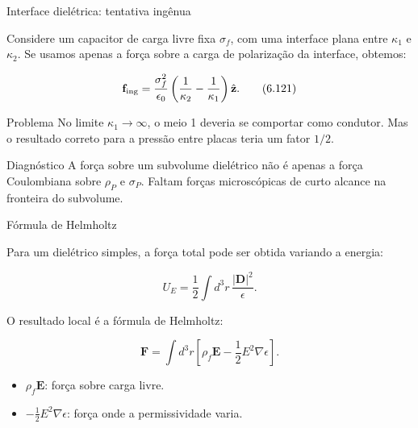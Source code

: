 \documentclass[aspectratio=169]{beamer}
\begin{document}
\begin{frame}{Interface dielétrica: tentativa ingênua}

\small

Considere um capacitor de carga livre fixa \(\sigma_f\), com uma interface plana
entre \(\kappa_1\) e \(\kappa_2\). Se usamos apenas a força sobre a carga de
polarização da interface, obtemos:

\begin{eqbox}
\begin{equation}
\mathbf f_{\rm ing}
=
\frac{\sigma_f^2}{\epsilon_0}
\left(
\frac{1}{\kappa_2}
-
\frac{1}{\kappa_1}
\right)\hat{\mathbf z}.
\tag{6.121}
\end{equation}
\end{eqbox}

\begin{alertblock}{Problema}
No limite \(\kappa_1\to\infty\), o meio 1 deveria se comportar como condutor.
Mas o resultado correto para a pressão entre placas teria um fator \(1/2\).
\end{alertblock}

\begin{mybox}{Diagnóstico}
A força sobre um subvolume dielétrico não é apenas a força Coulombiana sobre
\(\rho_P\) e \(\sigma_P\). Faltam forças microscópicas de curto alcance na fronteira
do subvolume.
\end{mybox}

\end{frame}

\begin{frame}{Fórmula de Helmholtz}

\small

Para um dielétrico simples, a força total pode ser obtida variando a energia:

\[
U_E=\frac12\int d^3r\,\frac{|\mathbf D|^2}{\epsilon}.
\]

O resultado local é a fórmula de Helmholtz:

\begin{eqbox}
\begin{equation}
\mathbf F
=
\int d^3r
\left[
\rho_f\mathbf E
-
\frac{1}{2}E^2\nabla\epsilon
\right].
\tag{6.130}
\label{eq:helmholtz-force}
\end{equation}
\end{eqbox}

\begin{itemize}
\item \(\rho_f\mathbf E\): força sobre carga livre.
\item \(-\frac12 E^2\nabla\epsilon\): força onde a permissividade varia.
\end{itemize}

\end{frame}
\end{document}
